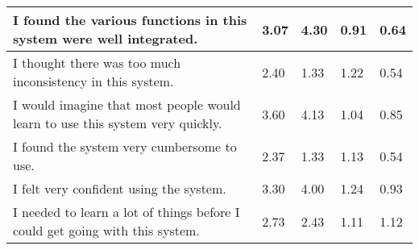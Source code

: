 \begin{table}[tb]
\begin{tabular}{@{}|m{6cm}R{1.7cm}R{1.7cm}R{1.7cm}R{1.7cm}|@{}}
    I found the various functions in this system were well integrated.                         & 3.07                                            & 4.30                                         & 0.91                                            & 0.64                                          \\ \midrule
    I thought there was too much inconsistency in this system.                                 & 2.40                                            & 1.33                                         & 1.22                                            & 0.54                                          \\ \midrule
    I would imagine that most people would learn to use this system very quickly.              & 3.60                                            & 4.13                                         & 1.04                                            & 0.85                                          \\ \midrule
    I found the system very cumbersome to use.                                                 & 2.37                                            & 1.33                                         & 1.13                                            & 0.54                                          \\ \midrule
    I felt very confident using the system.                                                    & 3.30                                            & 4.00                                         & 1.24                                            & 0.93                                          \\ \midrule
    I needed to learn a lot of things before I could get going with this system.               & 2.73                                            & 2.43                                         & 1.11                                           & 1.12                                          \\ \bottomrule
    \end{tabular}
    \end{table}